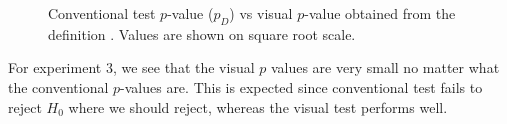 \documentclass[12pt]{article}
\newcommand{\hh}[1]{{\color{orange} #1}} %
\begin{document}
\begin{figure}[hbtp]
   \centering
       \caption{Conventional test $p$-value ($p_D$) vs visual $p$-value obtained from the definition . Values are shown on square root scale. }
       \label{fig:pval_definition}
\end{figure}


For experiment 3, we see that  the visual $p$ values are very small no matter what the conventional $p$-values are. This is expected since conventional test fails to reject $H_0$ where we should reject, whereas the visual test performs well.

\end{document}

